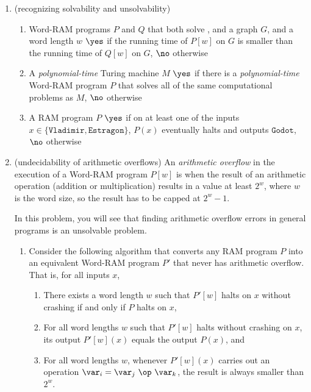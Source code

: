 \documentclass[11pt]{article}
\begin{document}
\begin{enumerate}
\item (recognizing solvability and unsolvability)
\begin{enumerate}
\item
\compprob{\WhichAlgorithmIsFaster}
{Word-RAM programs $P$ and $Q$ that both solve \GraphThreeColoring, and a graph $G$, and a word length $w$}
{$\yes$ if the running time of $P[w]$ on $G$ is smaller than the running time of $Q[w]$ on $G$, $\no$ otherwise}

\item
\compprob{\TMvsWordRAM}
{A {\em polynomial-time} Turing machine $M$}
{$\yes$ if there is a {\em polynomial-time} Word-RAM program $P$ that solves all of the same computational problems as $M$, $\no$ otherwise}

    \item
    \compprob{\WaitingForGodot}
{A RAM program $P$}
{$\yes$ if on at least one of the inputs $x\in \{\texttt{Vladimir}, \texttt{Estragon}\}$, $P(x)$ eventually halts and outputs $\texttt{Godot}$, $\no$ otherwise}

\end{enumerate}

  \item (undecidability of arithmetic overflows)
  An {\em arithmetic overflow} in the execution of a Word-RAM program $P[w]$ is when the result of an arithmetic operation (addition or multiplication) results in a value at least $2^w$, where $w$ is the word size, so the result has to be capped at $2^w-1$.

  In this problem, you will see that finding arithmetic overflow errors in general programs is an unsolvable problem.

  \begin{enumerate}
      \item Consider the following algorithm that converts any RAM program $P$ into an equivalent Word-RAM program $P'$ that never has arithmetic overflow.  That is, for all inputs $x$,
      \begin{enumerate}[label=C\arabic*]
          \item There exists a word length $w$ such that $P'[w]$ halts on $x$ without crashing if and only if $P$ halts on $x$,
          \item For all word lengths $w$ such that $P'[w]$ halts without crashing on $x$, its output $P'[w](x)$ equals the output $P(x)$, and
          \item For all word lengths $w$, whenever $P'[w](x)$ carries out an operation $\var_i = \var_j\ \op\ \var_k$, the result is always smaller than $2^w$.
      \end{enumerate}


\end{enumerate}
\end{enumerate}
\end{document}
